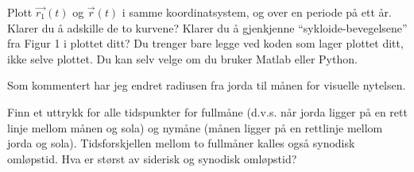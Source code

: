 \documentclass{../../myassignment}
\begin{document}
	\newpage

	\begin{problem}
		Plott $\vec{r_1}(t)$ og $\vec{r}(t)$ i samme koordinatsystem, og over en periode på ett år. Klarer du å adskille de to kurvene? Klarer du å gjenkjenne “sykloide-bevegelsene” fra Figur 1 i plottet ditt? Du trenger bare legge ved koden som lager plottet ditt, ikke selve plottet. Du kan selv velge om du bruker Matlab eller Python.
	\end{problem}
	\begin{answer}
		
		Som kommentert har jeg endret radiusen fra jorda til m{\aa}nen for visuelle nytelsen.
	\end{answer}
	\newpage
	\begin{problem}
		Finn et uttrykk for alle tidspunkter for fullmåne (d.v.s. når jorda ligger på en rett linje mellom månen og sola) og nymåne (månen ligger på en rettlinje mellom jorda og sola). Tidsforskjellen mellom to fullmåner kalles også synodisk omløpstid. Hva er størst av siderisk og synodisk omløpstid?	
	\end{problem}	
\end{document}
